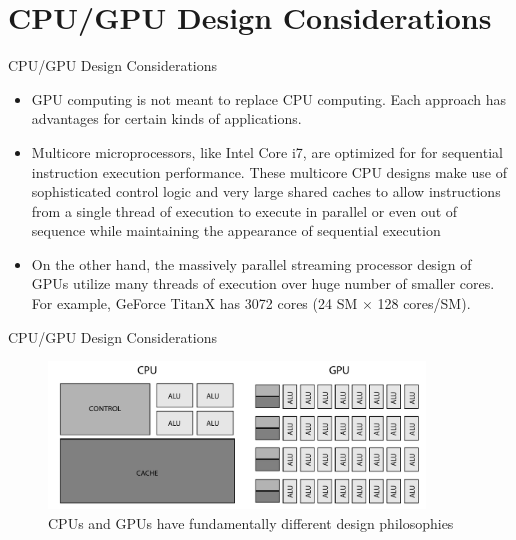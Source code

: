 \documentclass[handout]{beamer}
\begin{document}
\section{CPU/GPU Design Considerations}
\begin{frame}{CPU/GPU Design Considerations}
\begin{itemize}
	\item<1->GPU computing is not meant to replace CPU computing.  Each approach has advantages for certain kinds of applications. 
	\item<2->Multicore microprocessors, like Intel Core i7, are optimized for for sequential instruction execution performance. These multicore CPU designs make use of sophisticated control logic and very large shared caches to allow instructions from a single thread of execution to execute in parallel or even out of sequence while maintaining the appearance of sequential execution
	\item<3->On the other hand, the massively parallel streaming processor design of GPUs utilize many threads of execution over huge number of smaller cores. For example, GeForce TitanX has 3072 cores (24 SM $\times$ 128 cores/SM).
\end{itemize}
\end{frame}

\begin{frame}{CPU/GPU Design Considerations}
 \begin{figure}[ht]
 \label{fig:cpu_gpu_arch}
    	\begin{center}
        		\includegraphics[width=10cm]{../media/gpu_cpu_arch.pdf}
      \end{center}
 	\caption{CPUs and GPUs have fundamentally different design philosophies}
    \end{figure}
\end{frame}
\end{document}
